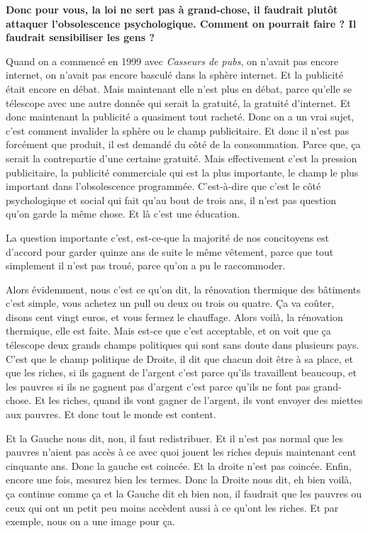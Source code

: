\begin{small}
\textbf{Donc pour vous, la loi ne sert pas à grand-chose, il faudrait plutôt attaquer l'obsolescence  psychologique. 
Comment on pourrait faire ? Il faudrait sensibiliser les gens ?}

\vspace{1\baselineskip}

Quand on a commencé en 1999 avec \textit{Casseurs de pubs}, on n'avait pas encore internet, on n'avait pas encore basculé dans la sphère internet. Et la publicité était encore en débat. Mais maintenant elle n'est plus en débat, parce qu’elle se télescope avec une autre donnée qui serait la gratuité, la gratuité d'internet. Et donc maintenant la publicité a quasiment tout racheté. Donc on a un vrai sujet, c'est comment invalider la sphère ou le champ publicitaire. Et donc il n'est pas forcément que produit, il est demandé du côté de la consommation. Parce que, ça serait la contrepartie d'une certaine gratuité. Mais effectivement c'est la pression publicitaire, la publicité commerciale qui est la plus importante, le champ le plus important dans l'obsolescence programmée. C'est-à-dire que c'est le côté psychologique et social qui fait qu'au bout de trois ans, il n'est pas question qu'on garde la même chose. Et là c'est une éducation.

La question importante c'est, est-ce-que la majorité de nos concitoyens est d'accord pour garder quinze ans de suite  le même vêtement, parce que tout simplement il n’est pas troué, parce qu'on a pu le raccommoder. 

\smallbreak
Alors évidemment, nous c'est ce qu'on dit, la rénovation thermique des bâtiments c'est simple, vous achetez un pull ou deux ou trois ou quatre. Ça va coûter, disons cent vingt euros, et vous fermez le chauffage. Alors voilà, la rénovation thermique, elle est faite. Mais est-ce que c'est acceptable, et on voit que ça télescope deux grands champs politiques qui sont sans doute dans plusieurs pays. C'est que le champ politique de Droite, il dit que chacun doit être à sa place, et que les riches, si ils gagnent de l'argent c'est parce qu'ils travaillent beaucoup, et les pauvres si ils ne gagnent pas d'argent c'est parce qu'ils  ne font pas grand-chose. Et les riches, quand ils vont gagner de l'argent, ils vont envoyer des miettes aux pauvres. Et donc tout le monde est content. 

Et la Gauche nous dit, non, il faut redistribuer. Et il n'est pas normal que les pauvres n'aient pas accès à ce avec quoi jouent les riches depuis maintenant cent cinquante ans. Donc la gauche est coincée. Et la droite n'est pas coincée. Enfin, encore une fois, mesurez bien les termes. Donc la Droite nous dit, eh bien voilà, ça continue comme ça et la Gauche dit eh bien non, il faudrait que les pauvres ou ceux qui ont un petit peu moins accèdent aussi à ce qu'ont les riches. Et par exemple, nous on a une image pour ça. 


\end{small}
